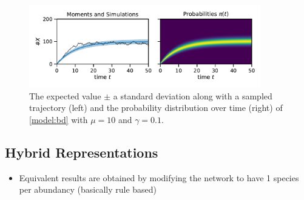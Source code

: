 \begin{figure}[htb]
    \centering
    \includegraphics[width=0.9\textwidth]{gfx/momsandprobs.pdf}
    \caption[Moments and probability distribution $\pi(t)$]{\label{fig:momsandprobs}The expected value $\pm$ a standard deviation along with a sampled trajectory (left) and the probability distribution over time (right) of \autoref{model:bd} with $\mu=10$ and $\gamma=0.1$.}
\end{figure}

\subsection{Hybrid Representations}
\begin{itemize}
    \item Equivalent results are obtained by modifying the network to have 1 species per abundancy (basically rule based)
\end{itemize}
\parencite{hasenauer2014method,kazeroonian2014modeling,andreychenko2015reconstruction}

